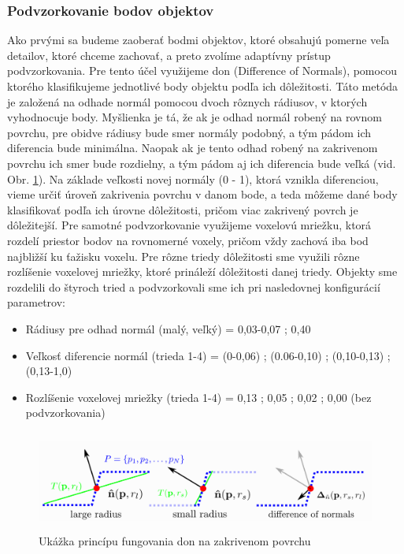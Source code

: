 \subsubsection{Podvzorkovanie bodov objektov}
\noindent Ako prvými sa budeme zaoberať bodmi objektov, ktoré obsahujú pomerne veľa detailov, ktoré chceme zachovať, a preto zvolíme adaptívny prístup podvzorkovania.
\newline\indent Pre tento účel využijeme \acrshort{don} (Difference of Normals), pomocou ktorého klasifikujeme jednotlivé body objektu podľa ich dôležitosti. Táto metóda je založená na odhade normál pomocou dvoch rôznych rádiusov, v ktorých vyhodnocuje body. Myšlienka je tá, že ak je odhad normál robený na rovnom povrchu, pre obidve rádiusy bude smer normály podobný, a tým pádom ich diferencia bude minimálna. Naopak ak je tento odhad robený na zakrivenom povrchu ich smer bude rozdielny, a tým pádom aj ich diferencia bude veľká (vid. Obr. \ref{fig:Don_principle}). Na základe veľkosti novej normály (0 - 1), ktorá vznikla diferenciou, vieme určiť úroveň zakrivenia povrchu v danom bode, a teda môžeme dané body klasifikovať podľa ich úrovne dôležitosti, pričom viac zakrivený povrch je dôležitejší.
\newline\indent Pre samotné podvzorkovanie využijeme voxelovú mriežku, ktorá rozdelí priestor bodov na rovnomerné voxely, pričom vždy zachová iba bod najbližší ku ťažisku voxelu. Pre rôzne triedy dôležitosti sme využili rôzne rozlíšenie voxelovej mriežky, ktoré prináleží dôležitosti danej triedy. Objekty sme rozdelili do štyroch tried a podvzorkovali sme ich pri nasledovnej konfigurácií parametrov:

\begin{itemize}
  \setlength\itemsep{0.2em}
  \item Rádiusy pre odhad normál (malý, veľký) = 0,03-0,07 ; 0,40
  \item Veľkosť diferencie normál (trieda 1-4) = (0-0,06) ; (0.06-0,10) ; (0,10-0,13) ; (0,13-1,0)
  \item Rozlíšenie voxelovej mriežky (trieda 1-4) = 0,13 ; 0,05 ; 0,02 ; 0,00 (bez podvzorkovania)
\end{itemize}

\begin{figure}[!htbp]
  \centering
  \includegraphics[width=15cm, height=3.3cm]{img/Don_principle.png}
  \caption{Ukážka princípu fungovania \acrshort{don} na zakrivenom povrchu \cite{DoN_segmentation}} 
  \label{fig:Don_principle}
\end{figure} 

